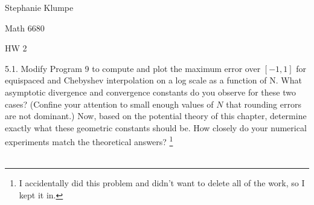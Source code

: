 \documentclass[12pt]{article}
\begin{document}
\noindent Stephanie Klumpe

\noindent Math 6680

\noindent HW 2

5.1. Modify Program 9 to compute and plot the maximum error over $[-1,1]$ for equispaced and Chebyshev interpolation
on a log scale as a function of N. What asymptotic divergence and convergence constants do you observe for these two
cases? (Confine your attention to small enough values of $N$ that rounding errors are not dominant.) Now, based on
the potential theory of this chapter, determine exactly what these geometric constants should be. How closely do your
numerical experiments match the theoretical answers?
\footnote{I accidentally did this problem and didn't want to delete all of the work, so I kept it in.}\\\\
\end{document}
